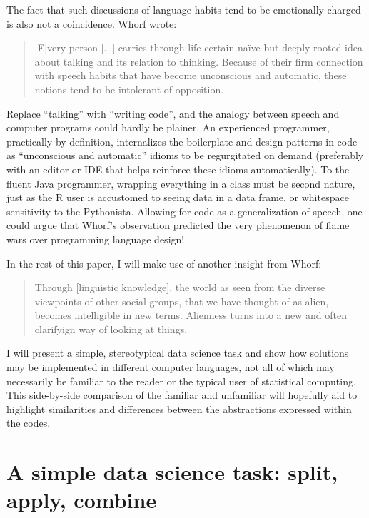 \documentclass[11pt]{asaproc}
\begin{document}
The fact that such discussions of language habits tend to be emotionally
charged is also not a coincidence. Whorf wrote:

\begin{quotation}
[E]very person [...] carries through life certain na\"ive but deeply rooted
idea about talking and its relation to thinking. Because of their firm
connection with speech habits that have become unconscious and automatic, these
notions tend to be intolerant of opposition.~\citep{Whorf1956sl}
\end{quotation}

Replace ``talking'' with ``writing code'', and the analogy between speech and
computer programs could hardly be plainer. An experienced programmer,
practically by definition, internalizes the boilerplate and design patterns in
code as ``unconscious and automatic'' idioms to be regurgitated on demand
(preferably with an editor or IDE that helps reinforce these idioms
automatically). To the fluent Java programmer, wrapping everything in a class
must be second nature, just as the R user is accustomed to seeing data in a
data frame, or whitespace sensitivity to the Pythonista.  Allowing for code as
a generalization of speech, one could argue that Whorf's observation predicted
the very phenomenon of flame wars over programming language design!

In the rest of this paper, I will make use of another insight from Whorf:

\begin{quotation}
Through [linguistic knowledge], the world as seen from the diverse viewpoints of
other social groups, that we have thought of as alien, becomes intelligible in
new terms. Alienness turns into a new and often clarifyign way of looking at
things.~\citep{Whorf1956lmr}
\end{quotation}

I will present a simple, stereotypical data science task and show how solutions
may be implemented in different computer languages, not all of which may
necessarily be familiar to the reader or the typical user of statistical
computing. This side-by-side comparison of the familiar and unfamiliar will
hopefully aid to highlight similarities and differences between the
abstractions expressed within the codes.



\section{A simple data science task: split, apply, combine}
\end{document}
